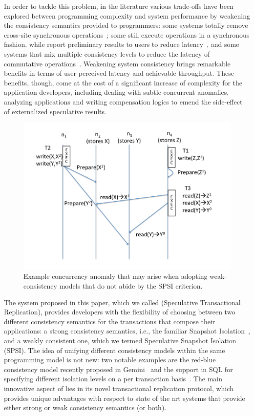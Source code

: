 In order to tackle this problem, in the literature various trade-offs have been explored between programming complexity and system performance by weakening the consistency semantics provided to programmers: some systems totally remove cross-site synchronous operations~\cite{kawell1988replicated, lloyd2011don, cure}; some still execute operations in a synchronous fashion, while report preliminary results to users to reduce latency~\cite{planet, icg}, and some systems that mix multiple consistency levels to reduce the latency of commutative operations~\cite{redblue, PSI}. Weakening system consistency brings remarkable benefits in terms of user-perceived latency and achievable throughput. These benefits, though, come at the cost of a significant increase of complexity for the application developers, including dealing with subtle concurrent anomalies, analyzing applications and writing compensation logics to emend the side-effect of externalized speculative results. 


\begin{figure}
\centering
\includegraphics[scale = 0.24]{figures/example.pdf}
\caption{\footnotesize Example concurrency anomaly that may arise when adopting weak-consistency models that do not abide by the SPSI criterion.}
\label{fig:example}
\end{figure}


The system proposed in this paper, which we called \specula (Speculative Transactional Replication), provides developers with the flexibility of choosing between two different consistency semantics for the transactions that compose their applications: a strong consistency semantics, i.e., the familiar Snapshot Isolation~\cite{snapshot-isolation}, and a weakly consistent one, which we termed Speculative Snapshot Isolation (SPSI). The idea of unifying different consistency models within the same programming model is not new: two notable examples are the red-blue consistency model recently proposed in Gemini~\cite{gemini} and the support in SQL for specifying different isolation levels on a per transaction basis~\cite{sqk}.  The main innovative aspect of \specula lies in its novel transactional replication protocol, which provides unique advantages with respect to state of the art systems that provide either strong or weak consistency semantics (or both).

